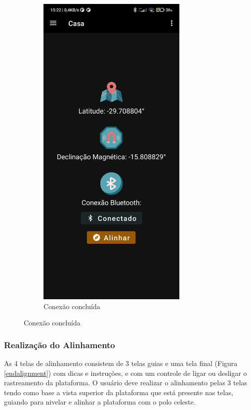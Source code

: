 \begin{figure}[!htb]
\begin{subfigure}[b]{0.3\textwidth}
		\includegraphics[width=0.8\textwidth]{figuras/desAplicativo/conectado}
		\caption{Conexão concluída}
	\end{subfigure}
\end{figure}




\subsubsection{Realização do Alinhamento}
As 4 telas de alinhamento consistem de 3 telas guias e uma tela final (Figura \ref{endalignment}) com dicas e instruções, e com um controle de ligar ou desligar o rastreamento da plataforma. O usuário deve realizar o alinhamento pelas 3 telas tendo como base a vista superior da plataforma que está presente nas telas, guiando para nivelar e alinhar a plataforma com o polo celeste. 

